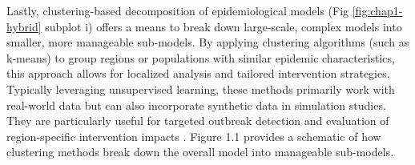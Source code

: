 Lastly, clustering-based decomposition of epidemiological models (Fig \ref{fig:chap1-hybrid} subplot i) offers a means to break down large-scale, complex models into smaller, more manageable sub-models. By applying clustering algorithms (such as k-means) to group regions or populations with similar epidemic characteristics, this approach allows for localized analysis and tailored intervention strategies. Typically leveraging unsupervised learning, these methods primarily work with real-world data but can also incorporate synthetic data in simulation studies. They are particularly useful for targeted outbreak detection and evaluation of region-specific intervention impacts \cite{bertozzi-villa_archetypes_2023} . Figure 1.1 provides a schematic of how clustering methods break down the overall model into manageable sub-models.



